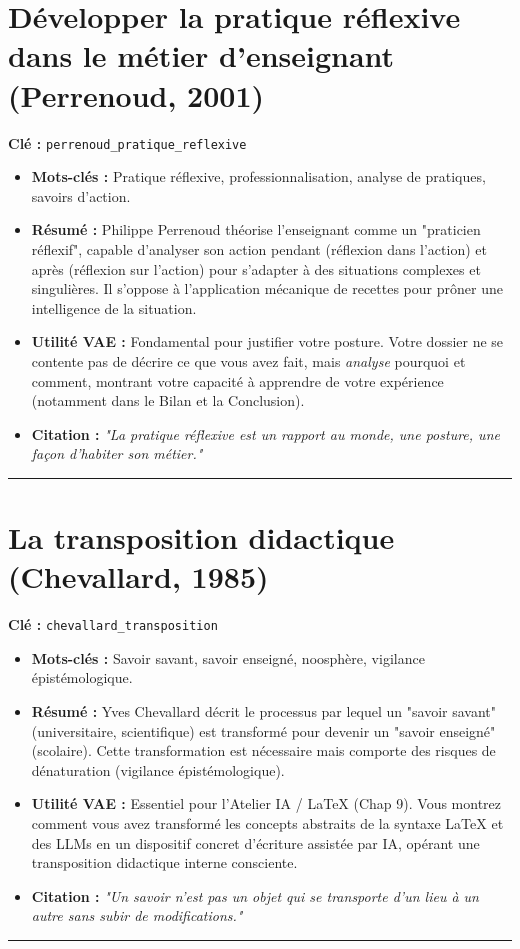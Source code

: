 
\section{Développer la pratique réflexive dans le métier d'enseignant (Perrenoud, 2001)}
\textbf{Clé :} \texttt{perrenoud\_pratique\_reflexive}
\begin{itemize}
    \item \textbf{Mots-clés :} Pratique réflexive, professionnalisation, analyse de pratiques, savoirs d'action.
    \item \textbf{Résumé :} Philippe Perrenoud théorise l'enseignant comme un "praticien réflexif", capable d'analyser son action pendant (réflexion dans l'action) et après (réflexion sur l'action) pour s'adapter à des situations complexes et singulières. Il s'oppose à l'application mécanique de recettes pour prôner une intelligence de la situation.
    \item \textbf{Utilité VAE :} Fondamental pour justifier votre posture. Votre dossier ne se contente pas de décrire ce que vous avez fait, mais \textit{analyse} pourquoi et comment, montrant votre capacité à apprendre de votre expérience (notamment dans le Bilan et la Conclusion).
    \item \textbf{Citation :} \textit{"La pratique réflexive est un rapport au monde, une posture, une façon d'habiter son métier."}
\end{itemize}
\hrule

\section{La transposition didactique (Chevallard, 1985)}
\textbf{Clé :} \texttt{chevallard\_transposition}
\begin{itemize}
    \item \textbf{Mots-clés :} Savoir savant, savoir enseigné, noosphère, vigilance épistémologique.
    \item \textbf{Résumé :} Yves Chevallard décrit le processus par lequel un "savoir savant" (universitaire, scientifique) est transformé pour devenir un "savoir enseigné" (scolaire). Cette transformation est nécessaire mais comporte des risques de dénaturation (vigilance épistémologique).
    \item \textbf{Utilité VAE :} Essentiel pour l'Atelier IA / \LaTeX{} (Chap 9). Vous montrez comment vous avez transformé les concepts abstraits de la syntaxe \LaTeX{} et des LLMs en un dispositif concret d'écriture assistée par IA, opérant une transposition didactique interne consciente.
    \item \textbf{Citation :} \textit{"Un savoir n'est pas un objet qui se transporte d'un lieu à un autre sans subir de modifications."}
\end{itemize}
\hrule

